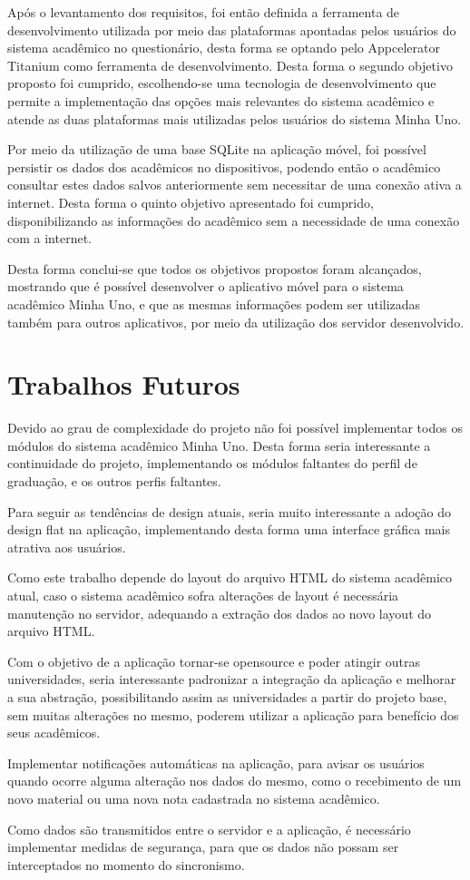 Após o levantamento dos requisitos, foi então definida a ferramenta de desenvolvimento utilizada por meio das plataformas apontadas pelos usuários do sistema acadêmico no questionário, desta forma se optando pelo Appcelerator Titanium como ferramenta de desenvolvimento. Desta forma o segundo objetivo proposto foi cumprido, escolhendo-se uma tecnologia de desenvolvimento que permite a implementação das opções mais relevantes do sistema acadêmico e atende as duas plataformas mais utilizadas pelos usuários do sistema Minha Uno.

Por meio da utilização de uma base SQLite na aplicação móvel, foi possível persistir os dados dos acadêmicos no dispositivos, podendo então o acadêmico consultar estes dados salvos anteriormente sem necessitar de uma conexão ativa a internet. Desta forma o quinto objetivo apresentado foi cumprido, disponibilizando as informações do acadêmico sem a necessidade de uma conexão com a internet.

Desta forma conclui-se que todos os objetivos propostos foram alcançados, mostrando que é possível desenvolver o aplicativo móvel para o sistema acadêmico Minha Uno, e que as mesmas informações podem ser utilizadas também para outros aplicativos, por meio da utilização dos servidor desenvolvido.

\section{Trabalhos Futuros}

Devido ao grau de complexidade do projeto não foi possível implementar todos os módulos do sistema acadêmico Minha Uno. Desta forma seria interessante a continuidade do projeto, implementando os módulos faltantes do perfil de graduação, e os outros perfis faltantes.

Para seguir as tendências de design atuais, seria muito interessante a adoção do design flat na aplicação, implementando desta forma uma interface gráfica mais atrativa aos usuários.

Como este trabalho depende do layout do arquivo HTML do sistema acadêmico atual, caso o sistema acadêmico sofra alterações de layout é necessária manutenção no servidor, adequando a extração dos dados ao novo layout do arquivo HTML.

Com o objetivo de a aplicação tornar-se opensource e poder atingir outras universidades, seria interessante padronizar a integração da aplicação e melhorar a sua abstração, possibilitando assim as universidades a partir do projeto base, sem muitas alterações no mesmo, poderem utilizar a aplicação para benefício dos seus acadêmicos.

Implementar notificações automáticas na aplicação, para avisar os usuários quando ocorre alguma alteração nos dados do mesmo, como o recebimento de um novo material ou uma nova nota cadastrada no sistema acadêmico.

Como dados são transmitidos entre o servidor e a aplicação, é necessário implementar medidas de segurança, para que os dados não possam ser interceptados no momento do sincronismo.